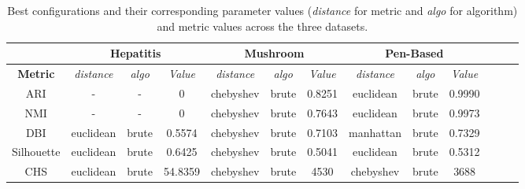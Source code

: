 \begin{table}[h!]
	\centering
	\begin{tabular}{|c|c|c|c|c|c|c|c|c|c|c|c|c|}
		\hline
		& \multicolumn{3}{c|}{\textbf{Hepatitis}} & \multicolumn{3}{c|}{\textbf{Mushroom}} & \multicolumn{3}{c|}{\textbf{Pen-Based}} \\ \hline
		\textbf{Metric} & \textit{distance} & \textit{algo} & \textit{Value} & \textit{distance} & \textit{algo} & \textit{Value} & \textit{distance} & \textit{algo} & \textit{Value} \\ \hline
		ARI            & -          & -         & 0  & chebyshev & brute & 0.8251         & euclidean & brute & 0.9990 \\ \hline
		NMI            & -          & -         & 0  & chebyshev & brute & 0.7643         & euclidean & brute & 0.9973 \\ \hline
		DBI            & euclidean  & brute     & 0.5574   & chebyshev & brute & 0.7103         & manhattan & brute & 0.7329 \\ \hline
		Silhouette     & euclidean  & brute     & 0.6425   & chebyshev & brute & 0.5041         & euclidean & brute & 0.5312 \\ \hline
		CHS            & euclidean  & brute     & 54.8359  & chebyshev & brute & 4530           & chebyshev & brute & 3688 \\ \hline
	\end{tabular}
	\caption{Best configurations and their corresponding parameter values (\textit{distance} for metric and \textit{algo} for algorithm) and metric values across the three datasets.}
	\label{tab:optics_best_runs}
\end{table}



